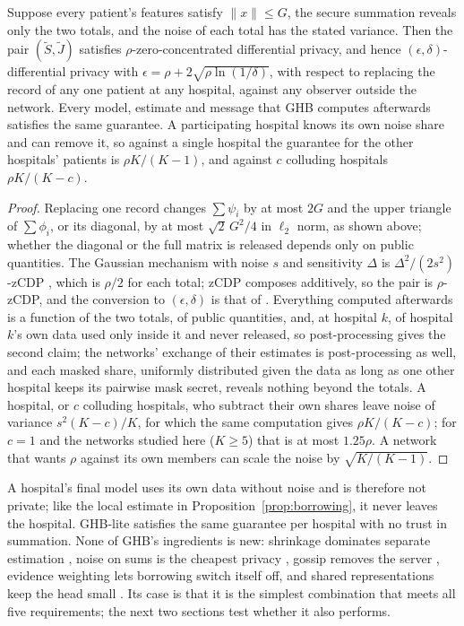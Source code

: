\documentclass[acmsmall,screen,review]{acmart}
\theoremstyle{acmdefinition}
\begin{document}
\begin{proposition}\label{prop:ghbprivacy}
Suppose every patient's features satisfy $\|x\|\le G$, the secure summation reveals only the two totals, and the noise of each total has the stated variance. Then the pair $(\tilde{S},\tilde{J})$ satisfies $\rho$-zero-concentrated differential privacy, and hence $(\epsilon,\delta)$-differential privacy with $\epsilon=\rho+2\sqrt{\rho\ln(1/\delta)}$, with respect to replacing the record of any one patient at any hospital, against any observer outside the network. Every model, estimate and message that GHB computes afterwards satisfies the same guarantee. A participating hospital knows its own noise share and can remove it, so against a single hospital the guarantee for the other hospitals' patients is $\rho K/(K-1)$, and against $c$ colluding hospitals $\rho K/(K-c)$.
\end{proposition}
\begin{proof}
Replacing one record changes $\sum\psi_i$ by at most $2G$ and the upper triangle of $\sum\phi_i$, or its diagonal, by at most $\sqrt2\,G^2/4$ in $\ell_2$ norm, as shown above; whether the diagonal or the full matrix is released depends only on public quantities. The Gaussian mechanism with noise $s$ and sensitivity $\Delta$ is $\Delta^2/(2s^2)$-zCDP \cite{bun2016concentrated}, which is $\rho/2$ for each total; zCDP composes additively, so the pair is $\rho$-zCDP, and the conversion to $(\epsilon,\delta)$ is that of \citet{bun2016concentrated}. Everything computed afterwards is a function of the two totals, of public quantities, and, at hospital $k$, of hospital $k$'s own data used only inside it and never released, so post-processing \cite{dwork2014algorithmic} gives the second claim; the networks' exchange of their estimates is post-processing as well, and each masked share, uniformly distributed given the data as long as one other hospital keeps its pairwise mask secret, reveals nothing beyond the totals. A hospital, or $c$ colluding hospitals, who subtract their own shares leave noise of variance $s^2(K-c)/K$, for which the same computation gives $\rho K/(K-c)$; for $c=1$ and the networks studied here ($K\ge5$) that is at most $1.25\rho$. A network that wants $\rho$ against its own members can scale the noise by $\sqrt{K/(K-1)}$.
\end{proof}

A hospital's final model uses its own data without noise and is therefore not private; like the local estimate in Proposition~\ref{prop:borrowing}, it never leaves the hospital. GHB-lite satisfies the same guarantee per hospital with no trust in summation. None of GHB's ingredients is new: shrinkage dominates separate estimation \cite{efron1973steins,stein1956inadmissibility}, noise on sums is the cheapest privacy \cite{bonawitz2017practical,dwork2014algorithmic}, gossip removes the server \cite{boyd2006randomized}, evidence weighting lets borrowing switch itself off, and shared representations keep the head small \cite{maurer2016benefit,tripuraneni2020theory}. Its case is that it is the simplest combination that meets all five requirements; the next two sections test whether it also performs.
\end{document}
